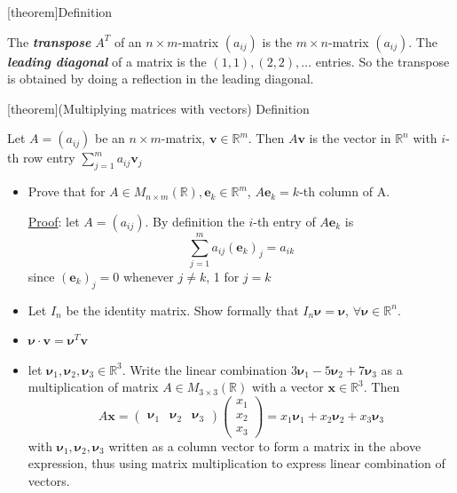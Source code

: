 \documentclass[12pt]{report}
\theoremstyle{definition}
\begin{document}
[theorem]{Definition}
\begin{transpose}
    The \textbf{\emph{transpose}} $A^{T}$ of an $n \times m$-matrix $(a_{ij})$ is 
    the $m \times n$-matrix $(a_{ij})$.
    The \textbf{\emph{leading diagonal}} of a matrix is the $(1, 1), (2, 2), \ldots$ entries.
    So the transpose is obtained by doing a reflection in the leading diagonal.
\end{transpose}

[theorem]{(Multiplying matrices with vectors) Definition}
\begin{multiplying matrix with vector}
    Let $A = (a_{ij})$ be an $n \times m$-matrix, $\pmb{v} \in \mathbb{R}^{m}$.
    Then $A\pmb{v}$ is the vector in $\mathbb{R}^{n}$ with $i$-th row entry $\sum_{j=1}^{m} a_{ij}\pmb{v}_j$
\end{multiplying matrix with vector}

\begin{ex}
    \;

    \begin{itemize}
            \item 
                Prove that for $A \in M_{n \times m}(\mathbb{R}), \pmb{e}_k \in \mathbb{R}^{m}$,
                $A\pmb{e}_k = k$-th column of A.
    
                \underline{Proof}: let $A = (a_{ij})$. By definition the $i$-th entry of $A\pmb{e}_k$ is\[
                    \sum_{j=1}^{m} a_{ij}{(\pmb{e}_k)}_j = a_{ik}
                \]since $ {(\pmb{e}_k)}_j = 0$ whenever $j \neq k$, 1 for $j = k$
            \item Let $I_n$ be the identity matrix. Show formally that $I_n \pmb{\nu} = \pmb{\nu}$, $\forall \pmb{\nu} \in \mathbb{R}^{n}$.
            \item $\pmb{\nu} \cdot \pmb{v} = \pmb{\nu}^{T} \pmb{v}$
            \item let $\pmb{\nu}_1, \pmb{\nu}_2, \pmb{\nu}_3 \in \mathbb{R}^{3}$.
                Write the linear combination $3\pmb{\nu}_1 - 5\pmb{\nu}_2 + 7\pmb{\nu}_3$ as a multiplication of matrix
                $A \in M_{3 \times 3}(\mathbb{R})$ with a vector $\pmb{x} \in \mathbb{R}^{3}$. Then\[
                    A\pmb{x} = \begin{pmatrix}
                        \pmb{\nu}_1 & \pmb{\nu}_2 & \pmb{\nu}_3
                    \end{pmatrix} 
                    \begin{pmatrix}
                            x_1 \\
                            x_2 \\
                            x_3
                    \end{pmatrix} 
                    = x_1\pmb{\nu}_1 + x_2\pmb{\nu}_2 + x_3\pmb{\nu}_3
                \]
                with $\pmb{\nu}_1, \pmb{\nu}_2, \pmb{\nu}_3$ written as a column vector to form a matrix
                in the above expression, thus using matrix multiplication to express linear combination of vectors.
    \end{itemize}
    
\end{ex}
\end{document}
